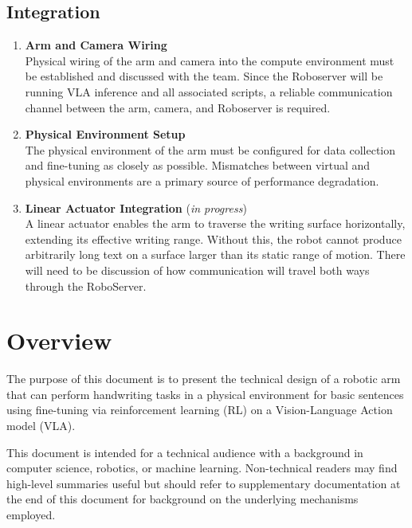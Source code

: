 \documentclass[12pt,a4paper]{article}
\begin{document}
\subsection*{Integration}

\begin{enumerate}

  \item \textbf{Arm and Camera Wiring} \\
  Physical wiring of the arm and camera into the compute environment must be established and discussed with the team. Since the Roboserver will be running VLA inference and all associated scripts, a reliable communication channel between the arm, camera, and Roboserver is required.

  \item \textbf{Physical Environment Setup} \\
  The physical environment of the arm must be configured for data collection and fine-tuning as closely as possible. Mismatches between virtual and physical environments are a primary source of performance degradation.

  \item \textbf{Linear Actuator Integration} (\textit{in progress}) \\
  A linear actuator enables the arm to traverse the writing surface horizontally, extending its effective writing range. Without this, the robot cannot produce arbitrarily long text on a surface larger than its static range of motion. There will need to be discussion of how communication will travel both ways through the RoboServer.

\end{enumerate}
\newpage

\section{Overview}

The purpose of this document is to present the technical design of a robotic arm that can perform handwriting tasks in a physical environment for basic sentences using fine-tuning via reinforcement learning (RL) on a Vision-Language Action model (VLA).

This document is intended for a technical audience with a background in computer science, robotics, or machine learning. Non-technical readers may find high-level summaries useful but should refer to supplementary documentation at the end of this document for background on the underlying mechanisms employed.
\newpage
\end{document}

